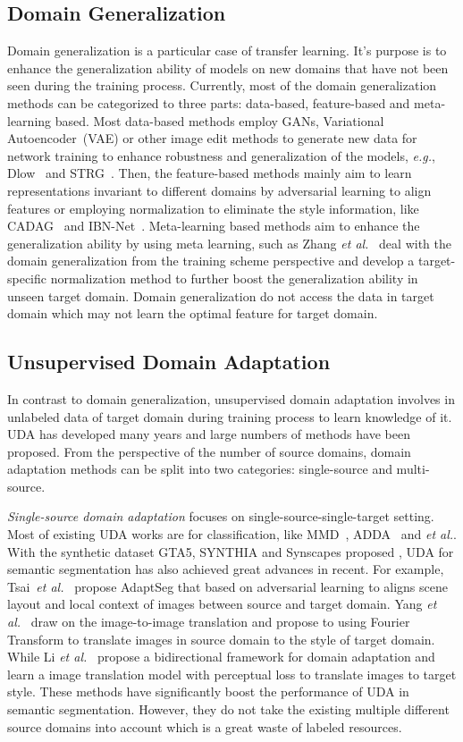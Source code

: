 \documentclass[final]{cvpr}
\def\etal{\textit{et al.}}
\def\eg{\textit{e.g.}}
\begin{document}
\subsection{Domain Generalization}
Domain generalization is a particular case of transfer learning. It's purpose is to enhance the generalization ability of models on new domains that have not been seen during the training process. Currently, most of the domain generalization methods can be categorized to three parts: data-based, feature-based and meta-learning based. Most data-based methods employ GANs, Variational Autoencoder~(VAE) or other image edit methods to generate new data for network training to enhance robustness and generalization of the models, \eg, Dlow~\cite{dlow_gong2019dlow} and STRG~\cite{yue2019domain}. Then, the feature-based methods mainly aim to learn representations invariant to different domains by adversarial learning to align features or employing normalization to eliminate the style information, like CADAG~\cite{rahman2020correlation} and IBN-Net~\cite{pan2018two}. Meta-learning based methods aim to enhance the generalization ability by using meta learning, such as Zhang \etal~\cite{zhang2020generalizable}  deal with the domain generalization from the training scheme perspective and develop a target-specific normalization method to further boost the generalization ability in unseen target domain. Domain generalization do not access the data in target domain which may not learn the optimal feature for target domain.

\subsection{Unsupervised Domain Adaptation}
In contrast to domain generalization, unsupervised domain adaptation involves in unlabeled data of target domain during training process to learn knowledge of it. UDA has developed many years and large numbers of methods have been proposed. From the perspective of the number of source domains, domain adaptation methods can be split into two categories: single-source and multi-source.

\textit{Single-source domain adaptation} focuses on single-source-single-target setting. Most of existing UDA works are for classification, like MMD~\cite{long2015learning,long2016unsupervised}, ADDA~\cite{tzeng2017adversarial} and \etal. With the synthetic dataset GTA5, SYNTHIA and Synscapes proposed , UDA for semantic segmentation has also achieved great advances in recent. For example, Tsai~\etal~\cite{tsai2018learning} propose AdaptSeg that based on adversarial learning to aligns scene layout and local context of images between source and target domain. 
Yang \etal~\cite{FDA_Yang_2020_CVPR} draw on the image-to-image translation and propose to using Fourier Transform to translate images in source domain to the style of target domain. While Li \etal~\cite{li2019bidirectional} propose a bidirectional framework for domain adaptation and learn a image translation model with perceptual loss to translate images to target style. These methods have significantly boost the performance of UDA in semantic segmentation. However, they do not take the existing multiple different source domains into account which is a great waste of labeled resources.
\end{document}
